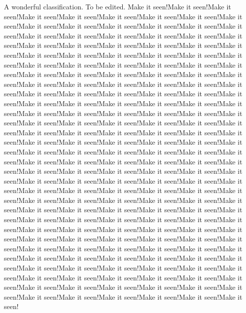 A wonderful classification. To be edited. Make it seen!Make it seen!Make it seen!Make it seen!Make it seen!Make it seen!Make it seen!Make it seen!Make it seen!Make it seen!Make it seen!Make it seen!Make it seen!Make it seen!Make it seen!Make it seen!Make it seen!Make it seen!Make it seen!Make it seen!Make it seen!Make it seen!Make it seen!Make it seen!Make it seen!Make it seen!Make it seen!Make it seen!Make it seen!Make it seen!Make it seen!Make it seen!Make it seen!Make it seen!Make it seen!Make it seen!Make it seen!Make it seen!Make it seen!Make it seen!Make it seen!Make it seen!Make it seen!Make it seen!Make it seen!Make it seen!Make it seen!Make it seen!Make it seen!Make it seen!Make it seen!Make it seen!Make it seen!Make it seen!Make it seen!Make it seen!Make it seen!Make it seen!Make it seen!Make it seen!Make it seen!Make it seen!Make it seen!Make it seen!Make it seen!Make it seen!Make it seen!Make it seen!Make it seen!Make it seen!Make it seen!Make it seen!Make it seen!Make it seen!Make it seen!Make it seen!Make it seen!Make it seen!Make it seen!Make it seen!Make it seen!Make it seen!Make it seen!Make it seen!Make it seen!Make it seen!Make it seen!Make it seen!Make it seen!Make it seen!Make it seen!Make it seen!Make it seen!Make it seen!Make it seen!Make it seen!Make it seen!Make it seen!Make it seen!Make it seen!Make it seen!Make it seen!Make it seen!Make it seen!Make it seen!Make it seen!Make it seen!Make it seen!Make it seen!Make it seen!Make it seen!Make it seen!Make it seen!Make it seen!Make it seen!Make it seen!Make it seen!Make it seen!Make it seen!Make it seen!Make it seen!Make it seen!Make it seen!Make it seen!Make it seen!Make it seen!Make it seen!Make it seen!Make it seen!Make it seen!Make it seen!Make it seen!Make it seen!Make it seen!Make it seen!Make it seen!Make it seen!Make it seen!Make it seen!Make it seen!Make it seen!Make it seen!Make it seen!Make it seen!Make it seen!Make it seen!Make it seen!Make it seen!Make it seen!Make it seen!Make it seen!Make it seen!Make it seen!Make it seen!Make it seen!Make it seen!Make it seen!Make it seen!Make it seen!Make it seen!Make it seen!Make it seen!Make it seen!Make it seen!Make it seen!Make it seen!Make it seen!Make it seen!Make it seen!Make it seen!Make it seen!Make it seen!Make it seen!Make it seen!Make it seen!Make it seen!Make it seen!Make it seen!Make it seen!Make it seen!Make it seen!Make it seen!Make it seen!